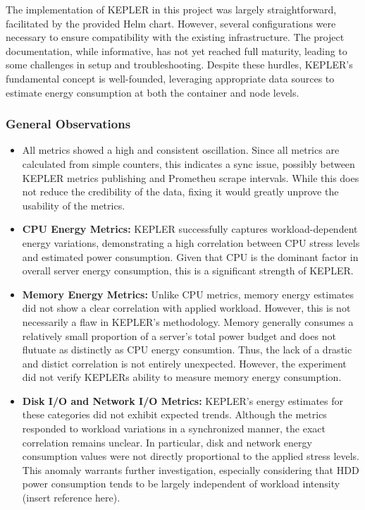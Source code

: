 The implementation of KEPLER in this project was largely straightforward, facilitated by the provided Helm chart. However, several configurations were necessary to ensure compatibility with the existing infrastructure. The project documentation, while informative, has not yet reached full maturity, leading to some challenges in setup and troubleshooting. Despite these hurdles, KEPLER’s fundamental concept is well-founded, leveraging appropriate data sources to estimate energy consumption at both the container and node levels.

\subsubsection{General Observations}

\begin{itemize}
\item All metrics showed a high and consistent oscillation. Since all metrics are calculated from simple counters, this indicates a sync issue, possibly between KEPLER metrics publishing and Prometheu scrape intervals. While this does not reduce the credibility of the data, fixing it would greatly unprove the usability of the metrics.
\item \textbf{CPU Energy Metrics:}
KEPLER successfully captures workload-dependent energy variations, demonstrating a high correlation between CPU stress levels and estimated power consumption. Given that CPU is the dominant factor in overall server energy consumption, this is a significant strength of KEPLER.
\item \textbf{Memory Energy Metrics:}
Unlike CPU metrics, memory energy estimates did not show a clear correlation with applied workload. However, this is not necessarily a flaw in KEPLER’s methodology. Memory generally consumes a relatively small proportion of a server’s total power budget and does not flutuate as distinctly as CPU energy consumtion. Thus, the lack of a drastic and distict correlation is not entirely unexpected. However, the experiment did not verify KEPLERs ability to measure memory energy consumption.
\item \textbf{Disk I/O and Network I/O Metrics:}
KEPLER’s energy estimates for these categories did not exhibit expected trends. Although the metrics responded to workload variations in a synchronized manner, the exact correlation remains unclear. In particular, disk and network energy consumption values were not directly proportional to the applied stress levels. This anomaly warrants further investigation, especially considering that HDD power consumption tends to be largely independent of workload intensity (insert reference here).
\end{itemize}

